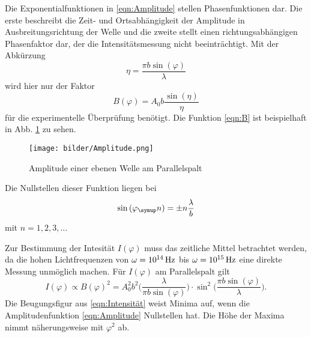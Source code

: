 Die Exponentialfunktionen in \eqref{eqn:Amplitude} stellen Phasenfunktionen dar.
Die erste beschreibt die Zeit- und Ortsabhängigkeit der Amplitude in Ausbreitungsrichtung
der Welle und die zweite stellt einen richtungsabhängigen Phasenfaktor dar, der
die Intensitätsmessung nicht beeinträchtigt.
Mit der Abkürzung
\begin{equation}
  \eta = \frac{\pi b \sin{(\varphi)}}{\lambda}
\end{equation}
wird hier nur der Faktor
\begin{equation}
  B(\varphi) = A_0 b \frac{\sin{(\eta)}}{\eta} \label{eqn:B}
\end{equation}
für die experimentelle Überprüfung benötigt.
Die Funktion \eqref{eqn:B} ist beispielhaft in Abb. \ref{fig:Amplitude} zu sehen.
\begin{figure}
  \centering
  \texttt{[image: bilder/Amplitude.png]}
  \caption{Amplitude einer ebenen Welle am Parallelspalt \cite{406}}
  \label{fig:Amplitude}
\end{figure}
Die Nullstellen dieser Funktion liegen bei
\begin{equation*}
  \sin{(\varphi_\su{n})} = \pm n \frac{\lambda}{b}
\end{equation*}
mit $n = 1, 2, 3,..$.

Zur Bestimmung der Intesität $I(\varphi)$ muss das zeitliche Mittel betrachtet
werden, da die hohen Lichtfrequenzen von $\omega = 10^{14}\,\si{\hertz}$ bis $\omega = 10^{15}\,\si{\hertz}$
eine direkte Messung unmöglich machen. Für $I(\varphi)$ am Parallelspalt gilt
\begin{equation}
  I(\varphi) \propto B(\varphi)^2 = A_0^2b^2 \bigg(\frac{\lambda}{\pi b \sin{(\varphi)}}\bigg)
  \cdot \sin^2{\bigg(\frac{\pi b \sin{(\varphi)}}{\lambda}\bigg)}.
  \label{eqn:Intensität}
\end{equation}
Die Beugungsfigur aus \eqref{eqn:Intensität} weist Minima auf, wenn die
Amplitudenfunktion \eqref{eqn:Amplitude} Nullstellen hat. Die Höhe der Maxima
nimmt näherungsweise mit $\varphi^2$ ab.


